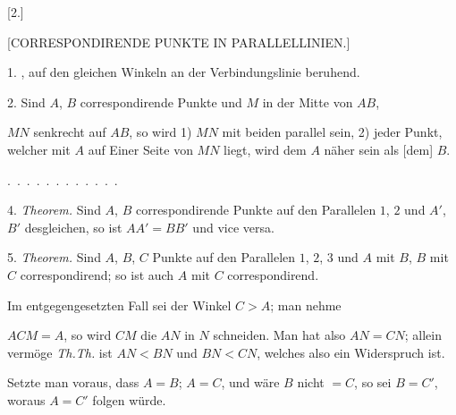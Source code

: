 \begin{center}[2.]\end{center}

\begin{center}[CORRESPONDIRENDE PUNKTE IN PARALLELLINIEN.]\end{center}

1. \emph{} , auf den gleichen Winkeln an der Verbindungslinie beruhend.

2. Sind $A$, $B$ correspondirende Punkte und $M$ in der Mitte von $AB$,

\begin{center}

\end{center}
\noindent $MN$ senkrecht auf $AB$, so wird 1) $MN$ mit beiden parallel sein, 2) jeder Punkt, welcher mit $A$ auf Einer Seite von $MN$ liegt, wird dem $A$ näher sein als [dem] $B$.

.\ .\ .\ .\ .\ .\ .\ .\ .\ .\ .\ . 

4. \emph{Theorem.} Sind $A$, $B$ correspondirende Punkte auf den Parallelen $1$, $2$ und $A'$, $B'$ desgleichen, so ist $AA' = BB'$ und vice versa.

5. \emph{Theorem.} Sind $A$, $B$, $C$ Punkte auf den Parallelen $1$, $2$, $3$ und $A$ mit $B$, $B$ mit $C$ correspondirend; so ist auch $A$ mit $C$ correspondirend.

 Im entgegengesetzten Fall sei der Winkel $C > A$; man nehme

\begin{center}

\end{center}
\noindent $ACM = A$, so wird $CM$ die $AN$ in $N$ schneiden. Man hat also $AN = CN$; allein vermöge \emph{Th.Th.} ist $AN < BN$ und $BN < CN$, welches also ein Widerspruch ist.

Setzte man voraus, dass $A = B$; $A = C$, und wäre $B$ nicht $= C$, so sei $B = C'$, woraus $A = C'$ folgen würde.

